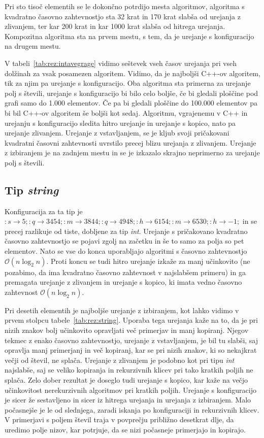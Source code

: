 \documentclass[a4paper,oneside,12pt]{article}
\newcommand{\lra}{\ensuremath{\longrightarrow}}
\begin{document}
Pri sto tisoč elementih se le dokončno potrdijo mesta algoritmov,
algoritma s kvadratno časovno zahtevnostjo sta 32 krat
in 170 krat slabša od urejanja z zlivanjem, ter kar 200 krat in kar 1000 krat slabša od hitrega 
urejanja. Kompozitna algoritma sta na prvem mestu, s tem, da je urejanje s
konfiguracijo na drugem mestu.

V tabeli~\ref{tab:rez:intavegrage} vidimo seštevek vseh časov urejanja pri vseh
dolžinah za vsak posamezen algoritem. Vidimo, da je najboljši C++-ov algoritem,
tik za njim pa urejanje s konfiguracijo. Oba algoritma sta primerna za urejanje
polj s števili, urejanje s konfiguracijo bi bilo celo boljše, če bi gledali
ploščine pod grafi samo do 1.000 elementov. Če pa bi gledali ploščine do 100.000
elementov pa bi bil C++-ov algoritem še boljši kot sedaj. 
Algoritmu, vgrajenemu v C++ in urejanju s konfiguracijo sledita hitro urejanje in urejanje
s kopico, nato pa urejanje zlivanjem. Urejanje z vstavljanjem, se je kljub svoji
pričakovani kvadratni časovni zahtevnosti uvrstilo precej blizu urejanja z
zlivanjem. Urejanje z izbiranjem je na zadnjem mestu in se je izkazalo skrajno 
neprimerno za urejanje polj s števili. 


\subsection{Tip \emph{string}}
Konfiguracija za ta tip je $:s \lra 5;:q \lra 3454;:m \lra 3844;:q \lra 4948;:h
\lra 6154;:m \lra 6530;:h \lra -1;$
in se precej razlikuje od tiste, dobljene za tip \emph{int}. Urejanje
s pričakovano kvadratno časovno zahtevnostjo se pojavi zgolj na začetku in še to samo za 
polja so pet elementov. Nato se vse do konca uporabljajo algoritmi s časovno zahtevnostjo 
$\mathcal{O}(n\log_2n)$. Proti koncu se tudi hitro urejanje izkaže za manj učinkovito (ne 
pozabimo, da ima kvadratno časovno zahtevnost v najslabšem primeru) in ga premagata urejanje
z zlivanjem in urejanje s kopico, ki imata vedno časovno zahtevnost $\mathcal{O}(n\log_2n)$. 

Pri desetih elementih je najboljše urejanje z izbiranjem, kot lahko vidimo v
prvem stolpcu tabele~\ref{tab:rez:string}.
Uporaba tega urejanja kaže na to, da je pri nizih znakov bolj učinkovito opravljati več
primerjav in manj kopiranj. Njegov tekmec z enako časovno zahtevnostjo, urejanje z 
vstavljanjem, je bil tu slabši, saj opravlja manj primerjanj in več kopiranj, kar se pri
nizih znakov, ki so nekajkrat večji od števil, ne splača. Urejanje z zlivanjem je podobno
kot pri tipu \emph{int} najslabše, saj se veliko kopiranja in rekurzivnih klicev pri tako 
kratkih poljih ne splača. Zelo dober rezultat je doseglo tudi urejanje s kopico, kar kaže 
na večjo učinkovitost nerekurzivnih algoritmov pri kratkih poljih. Urejanje s konfiguracijo
je sicer že sestavljeno in sicer iz hitrega urejanja in urejanja z izbiranjem. Malo počasnejše 
je le od slednjega, zaradi iskanja po konfiguraciji in rekurzivnih klicev.
V primerjavi s poljem števil traja v povprečju približno desetkrat dlje, da uredimo polje nizov,
kar potrjuje, da se nizi počasneje primerjajo in kopirajo.
\end{document}
